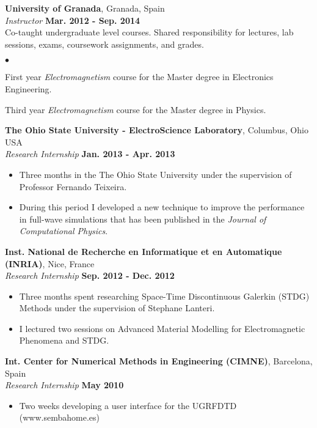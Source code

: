 \documentclass[margin,line]{res}
\newenvironment{list2}{
  \begin{list}{$\bullet$}{%
      \setlength{\itemsep}{0in}
      \setlength{\parsep}{0in} \setlength{\parskip}{0in}
      \setlength{\topsep}{0in} \setlength{\partopsep}{0in} 
      \setlength{\leftmargin}{0.2in}}}{\end{list}}
\begin{document}
\begin{resume}
{\bf University of Granada}, Granada, Spain\\
{\em Instructor} \hfill {\bf Mar. 2012 - Sep. 2014}\\
Co-taught undergraduate level courses.  Shared responsibility for lectures, lab sessions, exams, coursework assignments, and grades.  
\vspace*{.05in}  
\begin{list2}
 \item First year \textit{Electromagnetism} course for the Master degree in Electronics Engineering.
 \item Third year \textit{Electromagnetism} course for the Master degree in Physics. 
\end{list2}

{\bf The Ohio State University - ElectroScience Laboratory}, Columbus, Ohio USA\\
\vspace{-.3cm}
{\em Research Internship} \hfill {\bf Jan. 2013 - Apr. 2013}\\
\begin{itemize}
 \item Three months in the The Ohio State University under the supervision of Professor Fernando
Teixeira.
 \item During this period I developed a new technique to improve the performance in full-wave
simulations that has been published in the {\it Journal of Computational Physics}.
\end{itemize}

{\bf Inst. National de Recherche en Informatique et en Automatique (INRIA)}, Nice, France\\
\vspace{-.3cm}
{\em Research Internship} \hfill {\bf Sep. 2012 - Dec. 2012}\\
\begin{itemize}
 \item Three months spent researching Space-Time Discontinuous Galerkin (STDG) Methods under the supervision of Stephane Lanteri.
 \item I lectured two sessions on Advanced Material Modelling for Electromagnetic Phenomena and STDG.
\end{itemize}

{\bf Int. Center for Numerical Methods in Engineering (CIMNE)}, Barcelona, Spain\\
\vspace{-.3cm}
{\em Research Internship} \hfill {\bf May 2010}\\
\begin{itemize}
 \item Two weeks developing a user interface for the UGRFDTD (www.sembahome.es)
\end{itemize}


\end{resume}
\end{document}
